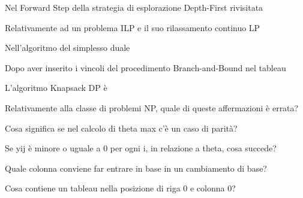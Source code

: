\documentclass[answers, a4paper, 11pt]{exam}
\begin{document}
\begin{questions}
\begin{solution}
\end{solution}

\question Nel Forward Step della strategia di esplorazione Depth-First rivisitata
\begin{solution}

\end{solution}

\question Relativamente ad un problema ILP e il suo rilassamento continuo LP
\begin{solution}

\end{solution}

\question Nell'algoritmo del simplesso duale
\begin{solution}

\end{solution}

\question Dopo aver inserito i vincoli del procedimento Branch-and-Bound nel tableau
\begin{solution}

\end{solution}

\question L'algoritmo Knapsack DP è
\begin{solution}

\end{solution}

\question Relativamente alla classe di problemi NP, quale di queste affermazioni è errata?
\begin{solution}

\end{solution}

\question Cosa significa se nel calcolo di theta max c'è un caso di parità?
\begin{solution}

\end{solution}

\question Se yij è minore o uguale a 0 per ogni i, in relazione a theta, cosa succede?
\begin{solution}

\end{solution}

\question Quale colonna conviene far entrare in base in un cambiamento di base?
\begin{solution}

\end{solution}

\question Cosa contiene un tableau nella posizione di riga 0 e colonna 0?
\begin{solution}


\end{solution}
\end{questions}
\end{document}
